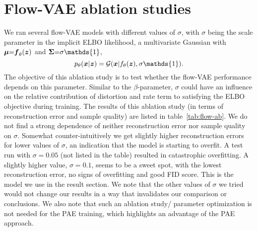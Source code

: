 \documentclass[10pt]{article} \usepackage[accepted]{tmlr}
\def\bi#1{\hbox{\boldmath{$#1$}}}
\begin{document}
\section{Flow-VAE ablation studies}
\label{app:sigma}
We ran several flow-VAE models with different values of $\sigma$, with $\sigma$ being the scale parameter in the implicit ELBO likelihood, a multivariate Gaussian with $\bi{\mu}{=}\bi{f}_\theta(\bi{z})$ and $\bi{\Sigma}{=}\sigma \mathds{1}$, 
\begin{equation}
    p_\theta(\bi{x}|\bi{z}) = \mathcal{G}(\bi{x}|f_\theta(\bi{z}),\sigma \mathds{1}).
\end{equation}
The objective of this ablation study is to test whether the flow-VAE performance depends on this parameter. Similar to the $\beta$-parameter, $\sigma$ could have an influence on the relative contribution of distortion and rate term to satisfying the ELBO objective during training. The results of this ablation study (in terms of reconstruction error and sample quality) are listed in table~\ref{tab:flow-ab}. We do not find a strong dependence of neither reconstruction error nor sample quality on $\sigma$. Somewhat counter-intuitively we get slightly higher reconstruction errors for lower values of $\sigma$, an indication that the model is starting to overfit. A test run with $\sigma=0.05$ (not listed in the table) resulted in catastrophic overfitting. 
A slightly higher value, 
$\sigma=0.1$, seems to be a sweet spot, with the lowest reconstruction error, no signs of overfitting and good FID score. This is the model we use in the result section. We note that the other values of $\sigma$ we tried would not change our results in a way that invalidates our comparison or conclusions. 
We also note that such an ablation study/ parameter optimization is not needed for the PAE training, which highlights an advantage of the PAE approach.
\end{document}
